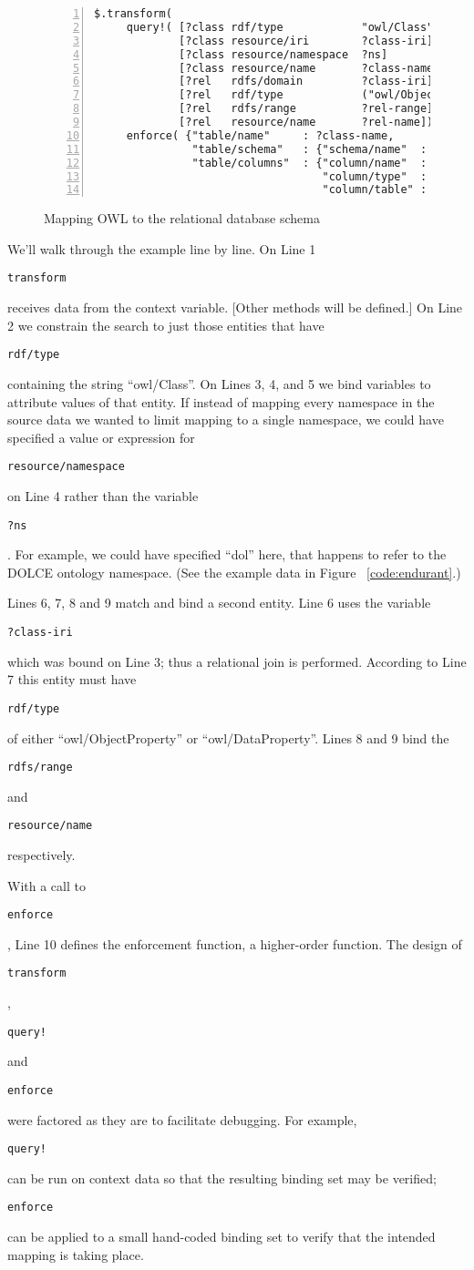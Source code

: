 \documentclass[9pt,letterpaper]{article}
\newcommand{\stt}[1]{\begin{footnotesize}\texttt{#1}\end{footnotesize}}
\begin{document}
\begin{figure}[H]
  \caption{Mapping OWL to the relational database schema}
  \label{code:mapping-owl-to-rdbms}
\begin{lstlisting}[numberstyle=\scriptsize,basicstyle=\ttfamily\scriptsize,numbers=left,stepnumber=1,breaklines=true]
 $.transform( 
     query!( [?class rdf/type            "owl/Class"]
             [?class resource/iri        ?class-iri]
             [?class resource/namespace  ?ns]
             [?class resource/name       ?class-name]
             [?rel   rdfs/domain         ?class-iri]
             [?rel   rdf/type            ("owl/ObjectProperty" or "owl/DataProperty")]
             [?rel   rdfs/range          ?rel-range]
             [?rel   resource/name       ?rel-name])
     enforce( {"table/name"     : ?class-name,
               "table/schema"   : {"schema/name"  : ?ns},
               "table/columns"  : {"column/name"  : ?rel-name,
                                   "column/type"  : ?rel-range,
                                   "column/table" : ?table-ent}} as ?table-ent))
\end{lstlisting}
\end{figure}

We'll walk through the example line by line.
On Line 1 \stt{transform} receives data from the context variable. [Other methods will be defined.] %
On Line 2 we constrain the search to just those entities that have \stt{rdf/type} containing the string ``owl/Class''.
On Lines 3, 4, and 5 we bind variables to attribute values of that entity.
If instead of mapping every namespace in the source data we wanted to limit mapping to a single namespace,
we could have specified a value or expression for \stt{resource/namespace} on Line 4 rather than the variable \stt{?ns}.
For example, we could have specified ``dol'' here, that happens to refer to the DOLCE ontology namespace.
(See the example data in Figure ~\ref{code:endurant}.)

Lines 6, 7, 8 and 9 match and bind a second entity. 
Line 6 uses the variable \stt{?class-iri} which was bound on Line 3; thus a relational join is performed. 
According to Line 7 this entity must have \stt{rdf/type} of either ``owl/ObjectProperty'' or ``owl/DataProperty''.
Lines 8 and 9 bind the \stt{rdfs/range} and \stt{resource/name} respectively.

With a call to \stt{enforce}, Line 10 defines the enforcement function, a higher-order function. 
The design of \stt{transform}, \stt{query!} and \stt{enforce} were factored as they are to facilitate debugging.
For example, \stt{query!} can be run on context data so that the resulting binding set may be verified;
\stt{enforce} can be applied to a small hand-coded binding set to verify that the intended mapping is taking place. 
\end{document}

